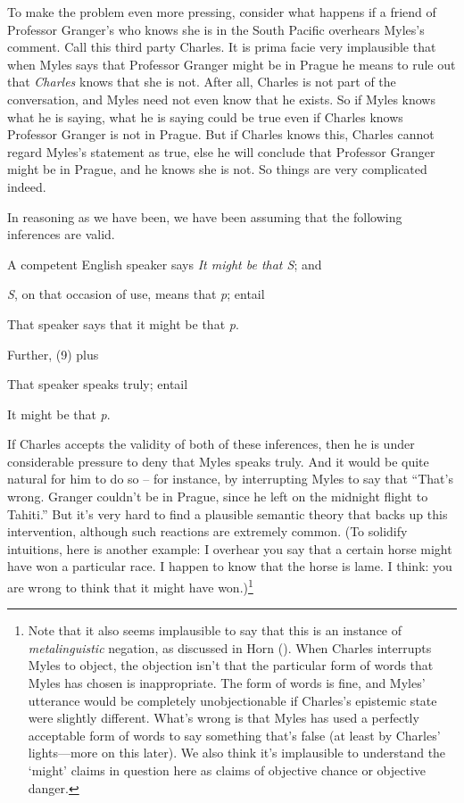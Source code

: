 \documentclass[
  11pt,
  letterpaper,
  DIV=11,
  numbers=noendperiod,
  twoside]{scrartcl}
\providecommand{\tightlist}{%
  \setlength{\itemsep}{0pt}\setlength{\parskip}{0pt}}
\begin{document}
To make the problem even more pressing, consider what happens if a
friend of Professor Granger's who knows she is in the South Pacific
overhears Myles's comment. Call this third party Charles. It is prima
facie very implausible that when Myles says that Professor Granger might
be in Prague he means to rule out that \emph{Charles} knows that she is
not. After all, Charles is not part of the conversation, and Myles need
not even know that he exists. So if Myles knows what he is saying, what
he is saying could be true even if Charles knows Professor Granger is
not in Prague. But if Charles knows this, Charles cannot regard Myles's
statement as true, else he will conclude that Professor Granger might be
in Prague, and he knows she is not. So things are very complicated
indeed.

In reasoning as we have been, we have been assuming that the following
inferences are valid.

\begin{description}
\tightlist
\item[(7)]
A competent English speaker says \emph{It might be that S}; and
\item[(8)]
\emph{S}, on that occasion of use, means that \emph{p}; entail
\item[(9)]
That speaker says that it might be that \emph{p}.
\end{description}

Further, (9) plus

\begin{description}
\tightlist
\item[(10)]
That speaker speaks truly; entail
\item[(11)]
It might be that \emph{p}.
\end{description}

If Charles accepts the validity of both of these inferences, then he is
under considerable pressure to deny that Myles speaks truly. And it
would be quite natural for him to do so -- for instance, by interrupting
Myles to say that ``That's wrong. Granger couldn't be in Prague, since
he left on the midnight flight to Tahiti.'' But it's very hard to find a
plausible semantic theory that backs up this intervention, although such
reactions are extremely common. (To solidify intuitions, here is another
example: I overhear you say that a certain horse might have won a
particular race. I happen to know that the horse is lame. I think: you
are wrong to think that it might have won.)\footnote{Note that it also
  seems implausible to say that this is an instance of
  \emph{metalinguistic} negation, as discussed in Horn
  (). When Charles interrupts Myles to
  object, the objection isn't that the particular form of words that
  Myles has chosen is inappropriate. The form of words is fine, and
  Myles' utterance would be completely unobjectionable if Charles's
  epistemic state were slightly different. What's wrong is that Myles
  has used a perfectly acceptable form of words to say something that's
  false (at least by Charles' lights---more on this later). We also
  think it's implausible to understand the `might' claims in question
  here as claims of objective chance or objective danger.}
\end{document}
